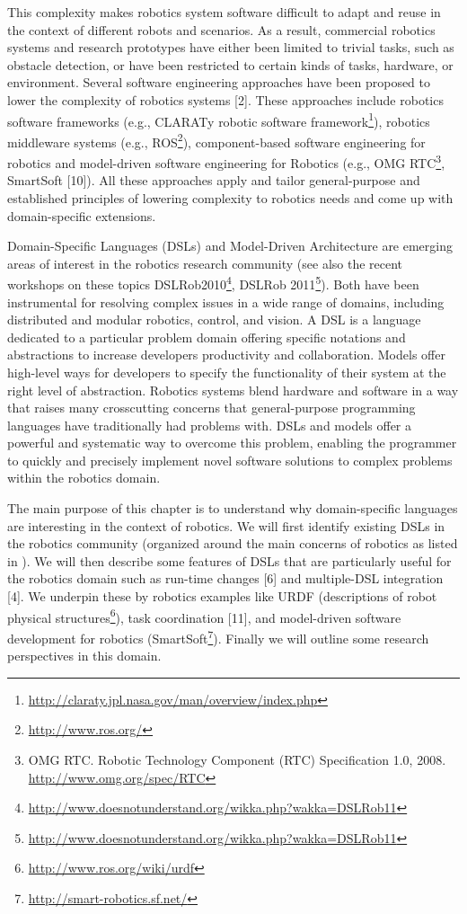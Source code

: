 \documentclass[jou]{apa}
\begin{document}
This complexity makes robotics system software difficult to adapt and reuse in the context of different robots and scenarios. As a result, commercial robotics systems and research prototypes have either been limited to trivial tasks, such as obstacle detection, or have been restricted to certain kinds of tasks, hardware, or environment. Several software engineering approaches have been proposed to lower the complexity of robotics systems [2]. These approaches include robotics software frameworks (e.g., CLARATy robotic software framework\footnote{\url{http://claraty.jpl.nasa.gov/man/overview/index.php}}), robotics middleware systems (e.g., ROS\footnote{\url{http://www.ros.org/}}), component-based software engineering for robotics\cite{Brugali:2007oq} and model-driven software engineering for Robotics (e.g., OMG RTC\footnote{OMG RTC. Robotic Technology Component (RTC) Specification 1.0, 2008. \url{http://www.omg.org/spec/RTC}}, SmartSoft [10]). All these approaches apply and tailor general-purpose and established principles of lowering complexity to robotics needs and come up with domain-specific extensions.

Domain-Specific Languages (DSLs)\cite{Deursen:2000uq} and Model-Driven Architecture are emerging areas of interest in the robotics research community (see also the recent workshops on these topics DSLRob2010\footnote{\url{http://www.doesnotunderstand.org/wikka.php?wakka=DSLRob11}}, DSLRob 2011\footnote{\url{http://www.doesnotunderstand.org/wikka.php?wakka=DSLRob11}}). Both have been instrumental for resolving complex issues in a wide range of domains, including distributed and modular robotics, control, and vision. A DSL is a language dedicated to a particular problem domain offering specific notations and abstractions to increase developers productivity and collaboration. Models offer high-level ways for developers to specify the functionality of their system at the right level of abstraction. Robotics systems blend hardware and software in a way that raises many crosscutting concerns that general-purpose programming languages have traditionally had problems with. DSLs and models offer a powerful and systematic way to overcome this problem, enabling the programmer to quickly and precisely implement novel software solutions to complex problems within the robotics domain.

The main purpose of this chapter is to understand why domain-specific languages are interesting in the context of robotics. We will first identify existing DSLs in the robotics community (organized around the main concerns of robotics as listed in \cite{SpringerHandbook:2008fk}). We will then describe some features of DSLs that are particularly useful for the robotics domain such as run-time changes [6] and multiple-DSL integration [4]. We underpin these by robotics examples like URDF (descriptions of robot physical structures\footnote{\url{http://www.ros.org/wiki/urdf}}), task coordination [11], and model-driven software development for robotics (SmartSoft\footnote{\url{http://smart-robotics.sf.net/}}). Finally we will outline some research perspectives in this domain.
\end{document}
